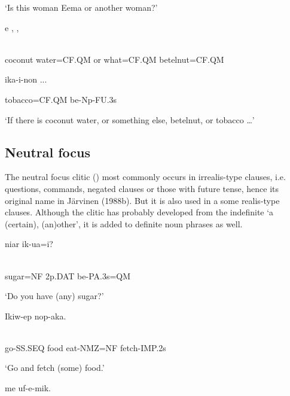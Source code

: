 `Is this woman Eema or another woman?'

\ea%
\label{ex:x1717}
\gll {}  e  ,  ,  \\
      \\
\glt
\z

coconut  water=CF.QM  or  what=CF.QM  betelnut=CF.QM

  ika-i-non  ...

tobacco=CF.QM  be-Np-FU.3s

`If there is coconut water, or something else, betelnut, or tobacco {\dots}'

\subsection{Neutral focus} 
\hypertarget{RefHeading23941935131865}{}
The neutral focus clitic () most commonly occurs in irrealis-type clauses, i.e. questions, commands, negated clauses or those with future tense, hence its original name in J\"arvinen (1988b). But it is also used in a some realis-type clauses. Although the clitic has probably developed from the indefinite  `a (certain), (an)other', it is added to definite noun phrases as well. 

\ea%
\label{ex:x1719}
\gll {}  niar  ik-ua=i? \\
      \\
\glt
\z

sugar=NF  2p.DAT  be-PA.3s=QM

`Do you have (any) sugar?'

\ea%
\label{ex:x1720}
\gll Ikiw-ep    nop-aka. \\
      \\
\glt
\z

go-SS.SEQ  food  eat-NMZ=NF  fetch-IMP.2s

`Go and fetch (some) food.'

\ea%
\label{ex:x1721}
\gll {}    me  uf-e-mik. \\
      \\
\glt
\z

